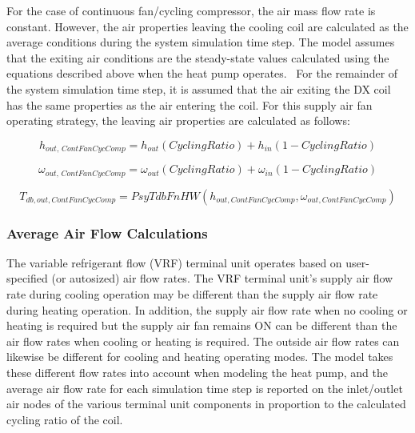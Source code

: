For the case of continuous fan/cycling compressor, the air mass flow rate is constant. However, the air properties leaving the cooling coil are calculated as the average conditions during the system simulation time step. The model assumes that the exiting air conditions are the steady-state values calculated using the equations described above when the heat pump operates.~ For the remainder of the system simulation time step, it is assumed that the air exiting the DX coil has the same properties as the air entering the coil. For this supply air fan operating strategy, the leaving air properties are calculated as follows:

\begin{equation}
{h_{out,\,ContFanCycComp}} = {h_{out}}\left( {CyclingRatio} \right) + {h_{in}}\left( {1 - CyclingRatio} \right)
\end{equation}

\begin{equation}
{\omega_{out,\,ContFanCycComp}} = {\omega_{out}}\left( {CyclingRatio} \right) + {\omega_{in}}\left( {1 - CyclingRatio} \right)
\end{equation}

\begin{equation}
{T_{db,out,ContFanCycComp}} = PsyTdbFnHW\left( {{h_{out,ContFanCycComp}},{\omega_{out,ContFanCycComp}}} \right)
\end{equation}

\subsubsection{Average Air Flow Calculations}\label{average-air-flow-calculations}

The variable refrigerant flow (VRF) terminal unit operates based on user-specified (or autosized) air flow rates. The VRF terminal unit's supply air flow rate during cooling operation may be different than the supply air flow rate during heating operation. In addition, the supply air flow rate when no cooling or heating is required but the supply air fan remains ON can be different than the air flow rates when cooling or heating is required. The outside air flow rates can likewise be different for cooling and heating operating modes. The model takes these different flow rates into account when modeling the heat pump, and the average air flow rate for each simulation time step is reported on the inlet/outlet air nodes of the various terminal unit components in proportion to the calculated cycling ratio of the coil.

